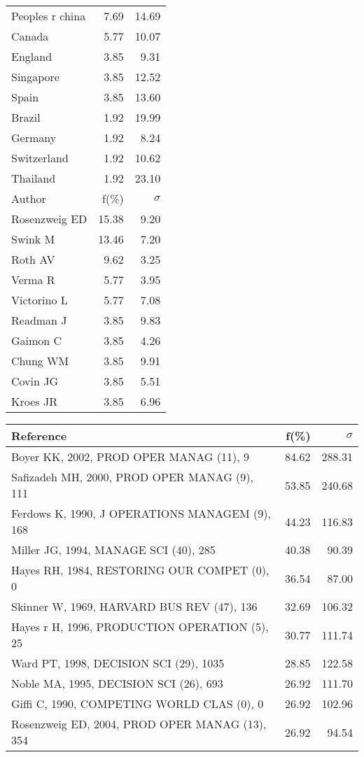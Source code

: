 \documentclass[a4paper,11pt]{report}
\begin{document}
\begin{landscape}
\begin{table}[!ht]
{\begin{tabular}{|l r r|}
Peoples r china & 7.69 & 14.69\\
Canada & 5.77 & 10.07\\
England & 3.85 & 9.31\\
Singapore & 3.85 & 12.52\\
Spain & 3.85 & 13.60\\
Brazil & 1.92 & 19.99\\
Germany & 1.92 & 8.24\\
Switzerland & 1.92 & 10.62\\
Thailand & 1.92 & 23.10\\
\hline
\hline
Author & f(\%) & $\sigma$\\
\hline
Rosenzweig ED & 15.38 & 9.20\\
Swink M & 13.46 & 7.20\\
Roth AV & 9.62 & 3.25\\
Verma R & 5.77 & 3.95\\
Victorino L & 5.77 & 7.08\\
Readman J & 3.85 & 9.83\\
Gaimon C & 3.85 & 4.26\\
Chung WM & 3.85 & 9.91\\
Covin JG & 3.85 & 5.51\\
Kroes JR & 3.85 & 6.96\\
\hline
\end{tabular}
}
{\scriptsize\begin{tabular}{|l r r|}
\hline
Reference & f(\%) & $\sigma$\\
\hline
Boyer KK, 2002, PROD OPER MANAG (11), 9 & 84.62 & 288.31\\
Safizadeh MH, 2000, PROD OPER MANAG (9), 111 & 53.85 & 240.68\\
Ferdows K, 1990, J OPERATIONS MANAGEM (9), 168 & 44.23 & 116.83\\
Miller JG, 1994, MANAGE SCI (40), 285 & 40.38 & 90.39\\
Hayes RH, 1984, RESTORING OUR COMPET (0), 0 & 36.54 & 87.00\\
Skinner W, 1969, HARVARD BUS REV (47), 136 & 32.69 & 106.32\\
Hayes r H, 1996, PRODUCTION OPERATION (5), 25 & 30.77 & 111.74\\
Ward PT, 1998, DECISION SCI (29), 1035 & 28.85 & 122.58\\
Noble MA, 1995, DECISION SCI (26), 693 & 26.92 & 111.70\\
Giffi C, 1990, COMPETING WORLD CLAS (0), 0 & 26.92 & 102.96\\
Rosenzweig ED, 2004, PROD OPER MANAG (13), 354 & 26.92 & 94.54\\

\end{tabular}}
\end{table}
\end{landscape}
\end{document}
